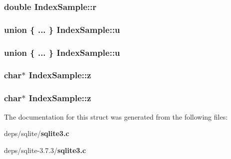 \subsubsection{\setlength{\rightskip}{0pt plus 5cm}double \bf{Index\-Sample::r}}\label{structIndexSample_d9c5db1ac03a530f20ef4e5c78a4c663}


\subsubsection{\setlength{\rightskip}{0pt plus 5cm}union \{ ... \}   \bf{Index\-Sample::u}}\label{structIndexSample_f64293e0fe1735c634492e6f4ff4b670}


\subsubsection{\setlength{\rightskip}{0pt plus 5cm}union \{ ... \}   \bf{Index\-Sample::u}}\label{structIndexSample_a73d2a9655498cdebb2cd79bd64b4f34}


\subsubsection{\setlength{\rightskip}{0pt plus 5cm}char$\ast$ \bf{Index\-Sample::z}}\label{structIndexSample_c0722df271c8acbde2c2adea7f5f11bb}


\subsubsection{\setlength{\rightskip}{0pt plus 5cm}char$\ast$ \bf{Index\-Sample::z}}\label{structIndexSample_c0722df271c8acbde2c2adea7f5f11bb}




The documentation for this struct was generated from the following files:\begin{CompactItemize}
\item 
deps/sqlite/\bf{sqlite3.c}\item 
deps/sqlite-3.7.3/\bf{sqlite3.c}\end{CompactItemize}
